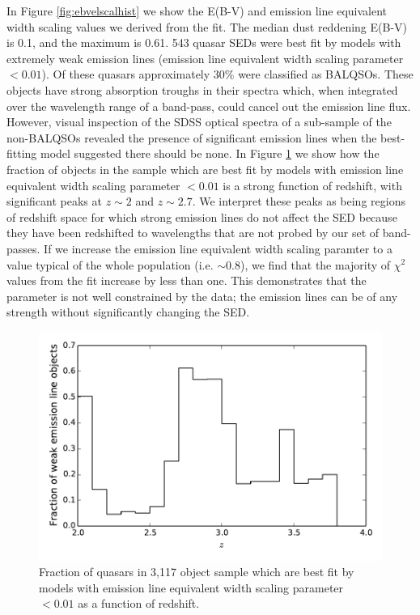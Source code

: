 In Figure \ref{fig:ebvelscalhist} we show the E(B-V) and emission line equivalent width scaling values we derived from the fit. The median dust reddening E(B-V) is 0.1, and the maximum is 0.61. 543 quasar SEDs were best fit by models with extremely weak emission lines (emission line equivalent width scaling parameter $< 0.01$). Of these quasars approximately 30\% were classified as BALQSOs. These objects have strong absorption troughs in their spectra which, when integrated over the wavelength range of a band-pass, could cancel out the emission line flux. However, visual inspection of the SDSS optical spectra of a sub-sample of the non-BALQSOs revealed the presence of significant emission lines when the best-fitting model suggested there should be none. In Figure \ref{fig:zhist_elscal} we show how the fraction of objects in the sample which are best fit by models with emission line equivalent width scaling parameter $< 0.01$ is a strong function of redshift, with significant peaks at $z \sim 2$ and $z \sim 2.7$. We interpret these peaks as being regions of redshift space for which strong emission lines do not affect the SED because they have been redshifted to wavelengths that are not probed by our set of band-passes. If we increase the emission line equivalent width scaling paramter to a value typical of the whole population (i.e. $\sim 0.8$), we find that the majority of $\chi^2$ values from the fit increase by less than one. This demonstrates that the parameter is not well constrained by the data; the emission lines can be of any strength without significantly changing the SED.   
 
\begin{figure}
  \centering
  \includegraphics[width=\textwidth]{figures/chapter06/zhist_elscal}
  \caption{Fraction of quasars in 3,117 object sample which are best fit by models with emission line equivalent width scaling parameter $< 0.01$ as a function of redshift.}
  \label{fig:zhist_elscal}
\end{figure}

